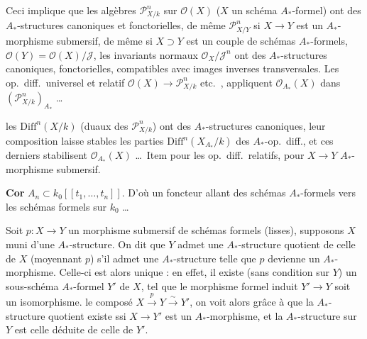 \documentclass[11pt,a4paper]{article}
\begin{document}

Ceci implique que les algèbres $\mathcal{P}^n_{X/k}$ sur $\mathcal{O}(X)$ ($X$ un
schéma $A_*$-formel) ont  des $A_*$-structures canoniques et
fonctorielles, de même $\mathcal{P}^n_{X/Y}$ si $X \to Y$ est un
$A_*$-morphisme submersif, de même \struck{\ill{}} si $X \supset Y$ est un
couple de schémas $A_*$-formels, $\mathcal{O}(Y) = \mathcal{O}(X)/\mathcal{J}$,
les invariants normaux $\mathcal{O}_X/\mathcal{J}^n$ ont des $A_*$-structures
canoniques, fonctorielles, compatibles avec images inverses transversales. Les
op.\ diff.\ universel et relatif
$\mathcal{O}(X) \to \mathcal{P}^n_{X/k}$ etc.\ ,
appliquent $\mathcal{O}_{A_*}(X)$ dans $(\mathcal{P}^n_{X/k})_{A_*}$ \ldots

 les $\mathrm{Diff}^n(X/k)$ (duaux des $\mathcal{P}^n_{X/k}$) ont
\struck{\ill{}} des $A_*$-structures canoniques, leur composition
 laisse stables les parties $\mathrm{Diff}^n(X_{A_*}/k)$ des
$A_*$-op.\ diff., et ces derniers stabilisent 
$\mathcal{O}_{A_*}(X)$ \ldots\ Item pour les op.\ diff.\ relatifs, pour
$X \to Y$ $A_*$-morphisme \struck{\ill{}} submersif.

\textbf{Cor} $A_n \subset k_0[[t_1, \ldots, t_n]]$. \struck{\ill{}} D'où un
foncteur allant \struck{\ill{}} des schémas $A_*$-formels vers les schémas
formels sur $k_0$ \ldots
{}


Soit $p : X \to Y$ un morphisme submersif de schémas formels (lisses),
supposons $X$ muni d'une $A_*$-structure. On dit que $Y$ admet une
$A_*$-structure quotient de celle de $X$ (moyennant $p$) s'il admet une
$A_*$-structure telle que $p$ devienne un $A_*$-morphisme. Celle-ci est alors
unique : en effet, il existe (sans condition sur $Y$) un \struck{\ill{}}
sous-schéma $A_*$-formel $Y'$ de $X$, tel que le morphisme formel induit
$Y' \to Y$ soit un isomorphisme.  le composé
$X \xrightarrow{p} Y \xrightarrow{\sim} Y'$, on voit alors grâce à
 que la $A_*$-structure quotient existe ssi $X \to Y'$ est un
$A_*$-morphisme, et la $A_*$-structure sur $Y$ est celle déduite de celle de
$Y'$.
\end{document}
